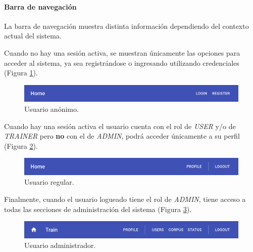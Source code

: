 \documentclass[12pt,a4paper,]{scrartcl}
\let\oldparagraph\paragraph
\renewcommand{\paragraph}[1]{\oldparagraph{#1}\mbox{}}
\begin{document}
\hypertarget{barra-de-navegaciuxf3n}{%
\paragraph{Barra de navegación}\label{barra-de-navegaciuxf3n}}

La barra de navegación muestra distinta información dependiendo del contexto actual del sistema.

Cuando no hay una sesión activa, se muestran únicamente las opciones para acceder al sistema, ya sea registrándose o ingresando utilizando credenciales (Figura \ref{fig:logic-status-anonymous}).

\begin{figure}[H]

{\centering \includegraphics{assets/logic/status-anonymous.pdf} 

}

\caption{Usuario anónimo.}\label{fig:logic-status-anonymous}
\end{figure}

Cuando hay una sesión activa el usuario cuenta con el rol de \emph{USER} y/o de \emph{TRAINER} pero \textbf{no} con el de \emph{ADMIN}, podrá acceder únicamente a su perfil (Figura \ref{fig:logic-status-user}).

\begin{figure}[H]

{\centering \includegraphics{assets/logic/status-user.pdf} 

}

\caption{Usuario regular.}\label{fig:logic-status-user}
\end{figure}

Finalmente, cuando el usuario logueado tiene el rol de \emph{ADMIN}, tiene acceso a todas las secciones de administración del sistema (Figura \ref{fig:logic-status-admin}).

\begin{figure}[H]

{\centering \includegraphics{assets/logic/status-admin.pdf} 

}

\caption{Usuario administrador.}\label{fig:logic-status-admin}
\end{figure}
\end{document}
